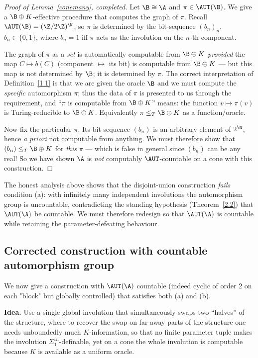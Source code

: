 \begin{proof}[Proof of Lemma~\ref{conemany}, completed]
Let $\B\cong\A$ and $\pi\in\AUT(\B)$. We give a $\B\oplus K$-effective procedure that
computes the graph of $\pi$. Recall $\AUT(\B)=(\Z/2\Z)^\N$, so $\pi$ is determined by
the bit-sequence $(b_n)_n$, $b_n\in\{0,1\}$, where $b_n=1$ iff $\pi$ acts as the
involution on the $n$-th component.

The graph of $\pi$ as a \emph{set} is automatically computable from $\B\oplus K$
\emph{provided} the map $C\mapsto b(C)$ (component $\mapsto$ its bit) is computable
from $\B\oplus K$ — but this map is not determined by $\B$; it is determined by
$\pi$. The correct interpretation of Definition~\ref{1.1} is that we are given the
oracle $\B$ and we must compute the \emph{specific} automorphism $\pi$; thus the
data of $\pi$ is presented to us through the requirement, and ``$\pi$ is computable
from $\B\oplus K$'' means: the function $v\mapsto\pi(v)$ is Turing-reducible to
$\B\oplus K$. Equivalently $\pi\le_T \B\oplus K$ as a function/oracle.

Now fix the particular $\pi$. Its bit-sequence $(b_n)$ is an arbitrary element of
$2^\N$, hence \emph{a priori} not computable from anything. We must therefore show
that $(b_n)\le_T \B\oplus K$ for \emph{this} $\pi$ — which is false in general since
$(b_n)$ can be any real! So we have shown $\A$ is \emph{not} computably
$\AUT$-countable on a cone with this construction.
\end{proof}

The honest analysis above shows that the disjoint-union construction \emph{fails}
condition (a): with infinitely many independent involutions the automorphism group
is uncountable, contradicting the standing hypothesis (Theorem~\ref{2.2}) that
$\AUT(\A)$ be countable. We must therefore redesign so that $\AUT(\A)$ is countable
while retaining the parameter-defeating behaviour.

\subsection{Corrected construction with countable automorphism group}

We now give a construction with $\AUT(\A)$ countable (indeed cyclic of order $2$ on
each "block" but globally controlled) that satisfies both (a) and (b).

\medskip

\noindent\textbf{Idea.} Use a single global involution that simultaneously swaps two
``halves'' of the structure, where to recover the swap on far-away parts of the
structure one needs unboundedly much $K$-information, so that no finite parameter
tuple makes the involution $\Sigma^{in}_1$-definable, yet on a cone the whole
involution is computable because $K$ is available as a uniform oracle.

